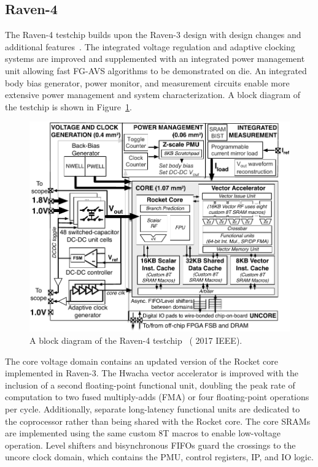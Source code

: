 \documentclass[graybox]{svmult}
\begin{document}
\subsection{Raven-4}

The Raven-4 testchip builds upon the Raven-3 design with design changes and additional features~\cite{Keller2017}.
The integrated voltage regulation and adaptive clocking systems are improved and supplemented with an integrated power management unit allowing fast FG-AVS algorithms to be demonstrated on die.
An integrated body bias generator, power monitor, and measurement circuits enable more extensive power management and system characterization.
A block diagram of the testchip is shown in Figure~\ref{fig:6-raven4-blockdiagram}.

\begin{figure}
  \centering
  \includegraphics[width=\textwidth]{6-raven4-blockdiagram}
  \caption{A block diagram of the Raven-4 testchip~\cite{Keller2017} ({\textcopyright} 2017 IEEE).}
  \label{fig:6-raven4-blockdiagram}
\end{figure}

The core voltage domain contains an updated version of the Rocket core implemented in Raven-3.
The Hwacha vector accelerator is improved with the inclusion of a second floating-point functional unit, doubling the peak rate of computation to two fused multiply-adds (FMA) or four floating-point operations per cycle.
Additionally, separate long-latency functional units are dedicated to the coprocessor rather than being shared with the Rocket core.
The core SRAMs are implemented using the same custom 8T macros to enable low-voltage operation.
Level shifters and bisynchronous FIFOs guard the crossings to the uncore clock domain, which contains the PMU, control registers, IP, and IO logic.
\end{document}
